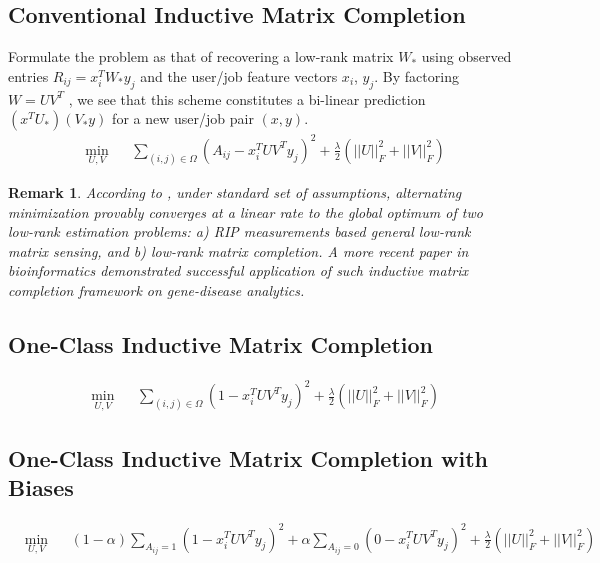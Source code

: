 \documentclass{article} %
\newtheorem{remark}{Remark}
\begin{document}
\subsection{Conventional Inductive Matrix Completion}
Formulate the problem as that of recovering a low-rank matrix $W_*$ using
observed entries $R_{ij} = x_i^T W_{*} y_j$ and the user/job feature vectors $x_i$, $y_j$. By
factoring $W = U V^T$ , we see that this scheme constitutes a bi-linear
prediction $(x^T U_{*})(V_{*} y)$ for a new user/job pair $(x, y)$.
\begin{equation}
    \begin{aligned}
        &\min_{U,V} &&\sum_{(i,j)\in \Omega} (A_{ij} - x_i^TUV^Ty_j)^2 
        + \frac{\lambda}{2}(||U||_F^2 + ||V||_F^2)
    \end{aligned}
\end{equation}
\begin{remark}
According to \cite{jain2013provable}, under standard set of assumptions,
alternating minimization provably converges at a linear rate to the global
optimum of two low-rank estimation problems: a) RIP measurements based general
low-rank matrix sensing, and b) low-rank matrix completion. A more recent
paper \cite{natarajan2014inductive} in bioinformatics demonstrated successful
application of such inductive matrix completion
framework on gene-disease analytics.
\end{remark}

\subsection{One-Class Inductive Matrix Completion}
\begin{equation}
    \begin{aligned}
        &\min_{U,V} &&\sum_{(i,j)\in\Omega} (1 - x_i^TUV^Ty_j)^2 
        + \frac{\lambda}{2}(||U||_F^2 + ||V||_F^2)
    \end{aligned}
\end{equation}

\subsection{One-Class Inductive Matrix Completion with Biases}
\begin{equation}
    \begin{aligned}
        &\min_{U,V} &&(1-\alpha) \sum_{A_{ij}=1} (1 - x_i^TUV^Ty_j)^2 +
        \alpha \sum_{A_{ij}=0} (0 - x_i^TUV^Ty_j)^2 + \frac{\lambda}{2}(||U||_F^2 + ||V||_F^2)
    \end{aligned}
\end{equation}
\end{document}
